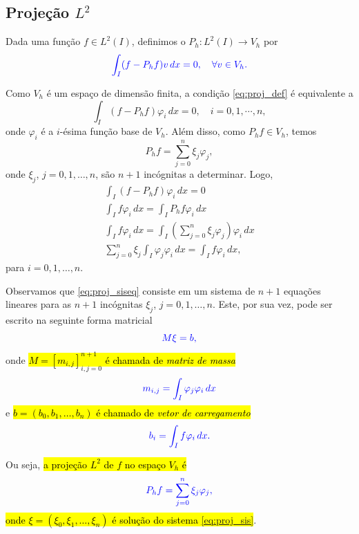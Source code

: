 \subsection{Projeção $L^2$}\label{subsec:projecao_1d}
\badgeRevisar

Dada uma função $f\in L^2(I)$, definimos o  $P_h:L^2(I)\to V_h$ por
\begin{equation}\label{eq:proj_def}\color{blue}\int_I (f-P_hf)v\,dx=0,\quad\forall v\in V_h.
\end{equation}

Como $V_h$ é um espaço de dimensão finita, a condição \eqref{eq:proj_def} é equivalente a
\begin{equation}
  \int_I (f-P_hf)\varphi_i\,dx=0,\quad i=0, 1, \cdots, n,
\end{equation}
onde $\varphi_i$ é a $i$-ésima função base de $V_h$. Além disso, como $P_hf\in V_h$, temos
\begin{equation}
  P_hf = \sum_{j=0}^n\xi_j\varphi_j,
\end{equation}
onde $\xi_j$, $j=0, 1, \dotsc, n$, são $n+1$ incógnitas a determinar. Logo,
\begin{gather}
  \int_I (f-P_hf)\varphi_i\,dx=0 \\
  \int_I f\varphi_i\,dx = \int_I P_hf\varphi_i\,dx\\
  \int_I f\varphi_i\,dx = \int_I \left(\sum_{j=0}^n \xi_j\varphi_j\right)\varphi_i\,dx\\
  \sum_{j=0}^n \xi_j\int_I\varphi_j\varphi_i\,dx = \int_I f\varphi_i\,dx,\label{eq:proj_siseq}
\end{gather}
para $i=0, 1, \dotsc, n$.

Observamos que \eqref{eq:proj_siseq} consiste em um sistema de $n+1$ equações lineares para as $n+1$ incógnitas $\xi_j$, $j=0, 1, \dotsc, n$. Este, por sua vez, pode ser escrito na seguinte forma matricial
\begin{equation}\label{eq:proj_sis}\color{blue}M\xi = b,
\end{equation}
onde \hl{$M = [m_{i,j}]_{i,j=0}^{n+1}$ é chamada de \emph{matriz de massa}}
\begin{equation}\color{blue}m_{i,j} = \int_I\varphi_j\varphi_i\,dx
\end{equation}
e \hl{$b = (b_0, b_1, \dotsc, b_n)$ é chamado de \emph{vetor de carregamento}}
\begin{equation}\color{blue}b_i = \int_I f\varphi_i\,dx.
\end{equation}

Ou seja, \hl{a projeção $L^2$ de $f$ no espaço $V_h$ é}
\begin{equation}\color{blue}P_hf = \sum_{j=0}^n\xi_j\varphi_j,
\end{equation}
\hl{onde $\xi = (\xi_0, \xi_1, \dotsc, \xi_n)$ é solução do sistema {\eqref{eq:proj_sis}}}.

